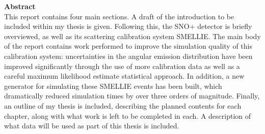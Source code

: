 	\normalsize\textbf{Abstract}\\
	This report contains four main sections. A draft of the introduction to be included within my thesis is given. Following this, the SNO+ detector is briefly overviewed, as well as its scattering calibration system SMELLIE. The main body of the report contains work performed to improve the simulation quality of this calibration system: uncertainties in the angular emission distribution have been improved significantly through the use of more calibration data as well as a careful maximum likelihood estimate statistical approach. In addition, a new generator for simulating these SMELLIE events has been built, which dramatically reduced simulation times by over three orders of magnitude. Finally, an outline of my thesis is included, describing the planned contents for each chapter, along with what work is left to be completed in each. A description of what data will be used as part of this thesis is included.
